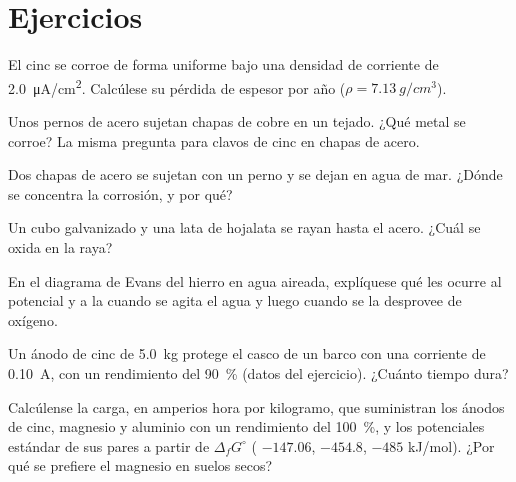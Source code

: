 \section{Ejercicios}

\begin{exercise}[$\star$]\label{exo:b2:corrosion:1}
El cinc se corroe de forma uniforme bajo una densidad de corriente de \qty{2.0}{\micro A/cm^2}.
Calcúlese su pérdida de espesor por año ($\rho = \qty{7.13}{g/cm^3}$).
\end{exercise}

\begin{exercise}[$\star$]\label{exo:b2:corrosion:2}
Unos pernos de acero sujetan chapas de cobre en un tejado. ¿Qué metal se corroe? La misma pregunta
para clavos de cinc en chapas de acero.
\end{exercise}

\begin{exercise}[$\star$]\label{exo:b2:corrosion:3}
Dos chapas de acero se sujetan con un perno y se dejan en agua de mar. ¿Dónde se
concentra la corrosión, y por qué?
\end{exercise}

\begin{exercise}[$\star$]\label{exo:b2:corrosion:4}
Un cubo galvanizado y una lata de hojalata se rayan hasta el acero. ¿Cuál
se oxida en la raya?
\end{exercise}

\begin{exercise}[$\star\star$]\label{exo:b2:corrosion:5}
En el diagrama de Evans del hierro en agua aireada, explíquese qué les ocurre al
potencial y a la  cuando se agita el agua y luego cuando se
la desprovee de oxígeno.
\end{exercise}

\begin{exercise}[$\star\star$]\label{exo:b2:corrosion:6}
Un ánodo de cinc de \qty{5.0}{kg} protege el casco de un barco con una corriente de
\qty{0.10}{A}, con un rendimiento del 90~\% (datos del ejercicio). ¿Cuánto tiempo
dura?
\end{exercise}

\begin{exercise}[$\star\star$]\label{exo:b2:corrosion:7}
Calcúlense la carga, en amperios hora por kilogramo, que suministran los ánodos de cinc, magnesio
y aluminio con un rendimiento del 100~\%, y los potenciales estándar de
sus pares a partir de $\Delta_f G^\circ$ ( $-147.06$,  $-454.8$,
 $-485$ \unit{kJ/mol}). ¿Por qué se prefiere el magnesio en suelos secos?
\end{exercise}

